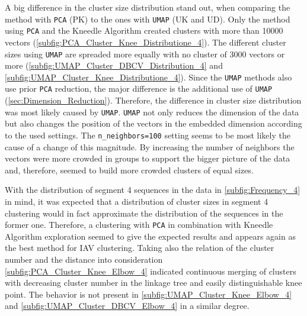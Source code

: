 \vspace{1em}

A big difference in the cluster size distribution stand out, when comparing the method with \texttt{PCA} (PK) to the ones with \texttt{UMAP} (UK and UD). Only the method using \texttt{PCA} and the Kneedle Algorithm created clusters with more than 10000 vectors (\autoref{subfig:PCA_Cluster_Knee_Distributione_4}). The different cluster sizes using \texttt{UMAP} are spreaded more equally with no cluster of 3000 vectors or more (\autoref{subfig:UMAP_Cluster_DBCV_Distribution_4} and \autoref{subfig:UMAP_Cluster_Knee_Distributione_4}). Since the \texttt{UMAP} methods also use prior \texttt{PCA} reduction, the major difference is the additional use of \texttt{UMAP} (\autoref{sec:Dimension_Reduction}). Therefore, the difference in cluster size distribution was most likely caused by \texttt{UMAP}. \texttt{UMAP} not only reduces the dimension of the data but also changes the position of the vectors in the embedded dimension according to the used settings. The \texttt{n\_neighbors=100} setting seems to be most likely the cause of a change of this magnitude. By increasing the number of neighbors the vectors were more crowded in groups to support the bigger picture of the data and, therefore, seemed to build more crowded clusters of equal sizes. 

\vspace{1em}

With the distribution of segment 4 sequences in the data in \autoref{subfig:Frequency_4} in mind, it was expected that a distribution of cluster sizes in segment 4 clustering would in fact approximate the distribution of the sequences in the former one. Therefore, a clustering with \texttt{PCA} in combination with Kneedle Algorithm exploration seemed to give the expected results and appears again as the best method for \gls{IAV} clustering. Taking also the relation of the cluster number and the distance into consideration \autoref{subfig:PCA_Cluster_Knee_Elbow_4} indicated continuous merging of clusters with decreasing cluster number in the linkage tree and easily distinguishable knee point. The behavior is not present in \autoref{subfig:UMAP_Cluster_Knee_Elbow_4} and \autoref{subfig:UMAP_Cluster_DBCV_Elbow_4} in a similar degree.  


